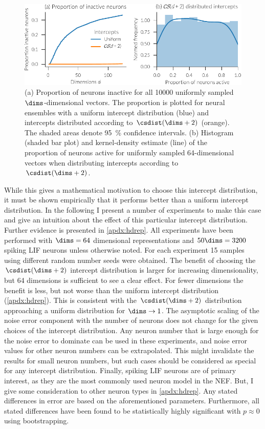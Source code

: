 \begin{figure}
    \centering
    \includegraphics{figures/act-cs}
    \caption[Proportion of inactive neurons and its distribution]{(a) Proportion of neurons inactive for all \num{10000} uniformly sampled $\dims$-dimensional vectors. The proportion is plotted for neural ensembles with a uniform intercept distribution (blue) and intercepts distributed according to $\csdist(\dims + 2)$ (orange). The shaded areas denote \SI{95}{\percent} confidence intervals. (b) Histogram (shaded bar plot) and kernel-density estimate (line) of the proportion of neurons active for uniformly sampled 64-dimensional vectors when distributing intercepts according to $\csdist(\dims + 2)$.}\label{fig:act-cs}
\end{figure}

While this gives a mathematical motivation to choose this intercept distribution, it must be shown empirically that it performs better than a uniform intercept distribution.
In the following I present a number of experiments to make this case and give an intuition about the effect of this particular intercept distribution.
Further evidence is presented in \cref{apdx:hdrep}.
All experiments have been performed with $\dims = 64$ dimensional representations and $50 \dims = 3200$ spiking LIF neurons unless otherwise noted.
For each experiment 15 samples using different random number seeds were obtained.
The benefit of choosing the $\csdist(\dims + 2)$ intercept distribution is larger for increasing dimensionality, but 64 dimensions is sufficient to see a clear effect.
For fewer dimensions the benefit is less, but not worse than the uniform intercept distribution (\cref{apdx:hdrep}).
This is consistent with the $\csdist(\dims + 2)$ distribution approaching a uniform distribution for $\dims \rightarrow 1$.
The asymptotic scaling of the noise error component with the number of neurons does not change for the given choices of the intercept distribution.
Any neuron number that is large enough for the noise error to dominate can be used in these experiments, and noise error values for other neuron numbers can be extrapolated.
This might invalidate the results for small neuron numbers, but such cases should be considered as special for any intercept distribution.
Finally, spiking LIF neurons are of primary interest, as they are the most commonly used neuron model in the NEF\@.
But, I give some consideration to other neuron types in \cref{apdx:hdrep}.
Any stated differences in error are based on the aforementioned parameters.
Furthermore, all stated differences have been found to be statistically highly significant with $p \approx 0$ using bootstrapping.

